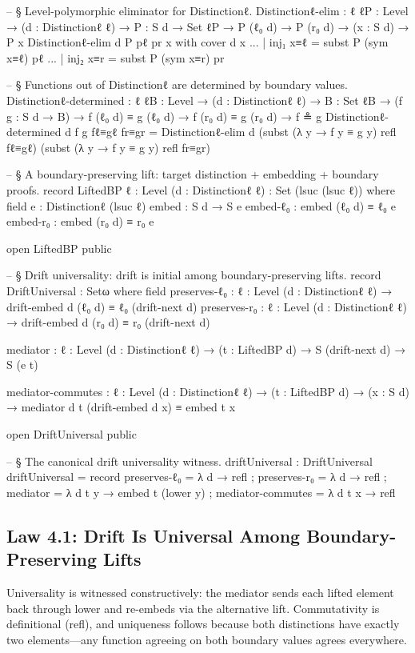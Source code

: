 \documentclass[11pt,a4paper]{book}
\def\texttt#1{#1}%
\begin{document}
\begin{code}
-- § Level-polymorphic eliminator for Distinctionℓ.
Distinctionℓ-elim :
  {ℓ ℓP : Level} → (d : Distinctionℓ ℓ) →
  {P : S d → Set ℓP} →
  P (ℓ₀ d) →
  P (r₀ d) →
  (x : S d) →
  P x
Distinctionℓ-elim d {P} pℓ pr x with cover d x
... | inj₁ x≡ℓ = subst P (sym x≡ℓ) pℓ
... | inj₂ x≡r = subst P (sym x≡r) pr

-- § Functions out of Distinctionℓ are determined by boundary values.
Distinctionℓ-determined :
  {ℓ ℓB : Level} → (d : Distinctionℓ ℓ) → {B : Set ℓB} →
  (f g : S d → B) →
  f (ℓ₀ d) ≡ g (ℓ₀ d) →
  f (r₀ d) ≡ g (r₀ d) →
  f ≗ g
Distinctionℓ-determined d f g fℓ≡gℓ fr≡gr =
  Distinctionℓ-elim d
    (subst (λ y → f y ≡ g y) refl fℓ≡gℓ)
    (subst (λ y → f y ≡ g y) refl fr≡gr)

-- § A boundary-preserving lift: target distinction + embedding + boundary proofs.
record LiftedBP {ℓ : Level} (d : Distinctionℓ ℓ) : Set (lsuc (lsuc ℓ)) where
  field
    e        : Distinctionℓ (lsuc ℓ)
    embed    : S d → S e
    embed-ℓ₀ : embed (ℓ₀ d) ≡ ℓ₀ e
    embed-r₀ : embed (r₀ d) ≡ r₀ e

open LiftedBP public

-- § Drift universality: drift is initial among boundary-preserving lifts.
record DriftUniversal : Setω where
  field
    preserves-ℓ₀ : {ℓ : Level} (d : Distinctionℓ ℓ) →
      drift-embed d (ℓ₀ d) ≡ ℓ₀ (drift-next d)
    preserves-r₀ : {ℓ : Level} (d : Distinctionℓ ℓ) →
      drift-embed d (r₀ d) ≡ r₀ (drift-next d)

    mediator : {ℓ : Level} (d : Distinctionℓ ℓ) → (t : LiftedBP d) →
      S (drift-next d) → S (e t)

    mediator-commutes : {ℓ : Level} (d : Distinctionℓ ℓ) → (t : LiftedBP d) →
      (x : S d) → mediator d t (drift-embed d x) ≡ embed t x

open DriftUniversal public

-- § The canonical drift universality witness.
driftUniversal : DriftUniversal
driftUniversal = record
  { preserves-ℓ₀ = λ d → refl
  ; preserves-r₀ = λ d → refl
  ; mediator = λ d t y → embed t (lower y)
  ; mediator-commutes = λ d t x → refl
  }
\end{code}

\subsection{Law 4.1: Drift Is Universal Among Boundary-Preserving Lifts}

Universality is witnessed constructively: the mediator sends each lifted element back through \texttt{lower} and re-embeds via the alternative lift.
Commutativity is definitional (\texttt{refl}), and uniqueness follows because both distinctions have exactly two elements---any function agreeing on both boundary values agrees everywhere.
\end{document}
